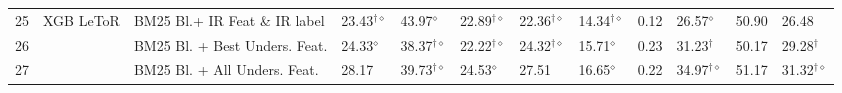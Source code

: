 \begin{table}
{\begin{tabular}{ccllllllllll}
\midrule 
\midrule
25 & \multirow{3}{*}{XGB LeToR} & BM25 Bl.+ IR Feat \& IR label  & 23.43$^{\dagger\diamond}$  & 43.97$^{\diamond}$  & 22.89$^{\dagger\diamond}$  & 22.36$^{\dagger\diamond}$  & 14.34$^{\dagger\diamond}$  & 0.12  & 26.57$^{\diamond}$  & 50.90  & 26.48\tabularnewline
26  &  & BM25 Bl. + Best Unders. Feat.  & 24.33$^{\diamond}$  & 38.37$^{\dagger\diamond}$  & 22.22$^{\dagger\diamond}$  & 24.32$^{\dagger\diamond}$  & 15.71$^{\diamond}$  & 0.23  & 31.23$^{\dagger}$  & 50.17  & 29.28$^{\dagger}$ \tabularnewline
27  &  & BM25 Bl. + All Unders. Feat.  & 28.17  & 39.73$^{\dagger\diamond}$  & 24.53$^{\diamond}$  & 27.51  & 16.65$^{\diamond}$  & 0.22  & 34.97$^{\dagger\diamond}$  & 51.17  & 31.32$^{\dagger\diamond}$ \tabularnewline
\bottomrule
\end{tabular}} %
\end{table}

